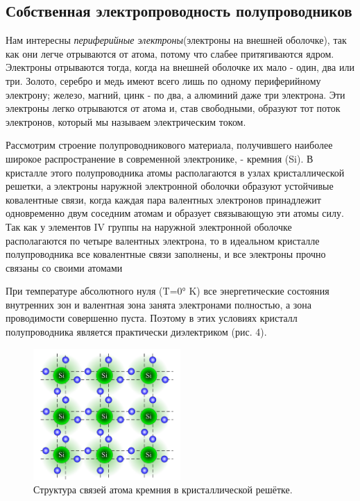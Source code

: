 	
	\clearpage

	\subsection{Собственная электропроводность полупроводников}
	
	\par Нам интересны \textit{периферийные электроны}(электроны на внешней оболочке), так как они легче отрываются от атома, потому что слабее притягиваются ядром. Электроны отрываются тогда, когда на внешней оболочке их мало - один, два или три. Золото, серебро и медь имеют всего лишь по одному периферийному электрону; железо, магний, цинк - по два, а алюминий даже три электрона. Эти электроны легко отрываются от атома и, став свободными, образуют тот поток электронов, который мы называем электрическим током.
	
	\par Рассмотрим строение полупроводникового материала, получившего наиболее широкое распространение в современной электронике, - кремния (Si). В кристалле этого полупроводника атомы располагаются в узлах кристаллической решетки, а электроны наружной электронной оболочки образуют устойчивые ковалентные связи, когда каждая пара валентных электронов принадлежит одновременно двум соседним атомам и образует связывающую эти атомы силу. Так как у элементов IV группы на наружной электронной оболочке располагаются по четыре валентных электрона, то в идеальном кристалле полупроводника все ковалентные связи заполнены, и все электроны прочно связаны со своими атомами
	
    \par  При температуре абсолютного нуля (T=0° K) все энергетические состояния внутренних зон и валентная зона занята электронами полностью, а зона проводимости совершенно пуста. Поэтому в этих условиях кристалл полупроводника является практически диэлектриком (рис. 4).
	
	\begin{figure}[h]
		\centering
		\includegraphics[height=5cm]{img/5} 
		\captionsetup{font=footnotesize}
		\caption{Структура связей атома кремния в кристаллической решётке.} 
	\end{figure}
	
